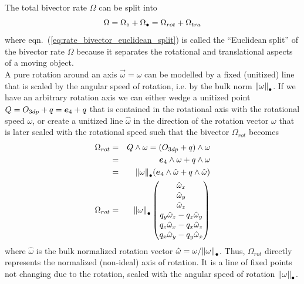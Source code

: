 The total bivector rate $\Omega$ can be split into
\begin{equation}
   \Omega = {\Omega}_\circ + {\Omega}_\bullet = \Omega_{rot} + \Omega_{tra}
   \label{eq:rate_bivector_euclidean_split}
\end{equation}
where eqn.~(\ref{eq:rate_bivector_euclidean_split}) is called the ``Euclidean split'' of
the bivector rate $\Omega$ because it separates the rotational and translational aspects
of a moving object. \\

A pure rotation around an axis $\vec{\omega} = \omega$ can be modelled by a fixed
(unitized) line that is scaled by the angular speed of rotation, i.e. by the bulk norm
${\left \lVert {\omega} \right \rVert}_\bullet$. If we have an arbitrary rotation axis we can either wedge a
unitized point $Q = O_{3dp} + q = \bm{e}_{4} + q$ that is contained in the rotational axis
with the rotational speed $\omega$, or create a unitized line $\hat{\omega}$ in the
direction of the rotation vector $\omega$ that is later scaled with the rotational speed
such that the bivector $\Omega_{rot}$ becomes
\begin{eqnarray}
   \Omega_{rot} &=& Q \wedge \omega = (O_{3dp} + q) \wedge \omega \nonumber \\
                &=& \bm{e}_{4} \wedge \omega + q \wedge \omega \nonumber \\
                &=& {\left \lVert {\omega} \right \rVert}_\bullet(\bm{e}_{4} \wedge \hat{\omega} + q \wedge \hat{\omega})
                \nonumber \\ 
   \Omega_{rot} &=&
   {\left \lVert {\omega} \right \rVert}_\bullet
   \begin{pmatrix}
      \hat{\omega}_x \\
      \hat{\omega}_y \\
      \hat{\omega}_z \\
      q_y \hat{\omega}_z - q_z \hat{\omega}_y \\
      q_z \hat{\omega}_x - q_x \hat{\omega}_z \\
      q_x \hat{\omega}_y - q_y \hat{\omega}_x
   \end{pmatrix}
   \label{eq:bivector_rot_rate_omega_vec}
\end{eqnarray}
where $\hat{\omega}$ is the bulk normalized rotation vector
$\hat{\omega}=\omega/{\left \lVert {\omega} \right \rVert}_\bullet$. Thus, $\Omega_{rot}$ directly represents the
normalized (non-ideal) axis of rotation. It is a line of fixed points not changing due to
the rotation, scaled with the angular speed of rotation ${\left \lVert {\omega} \right \rVert}_\bullet$. \\

